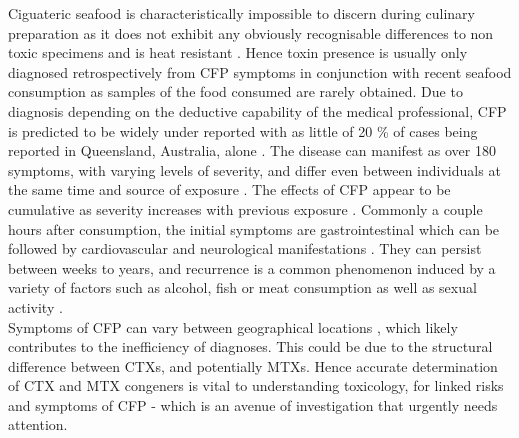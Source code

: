 \documentclass[12pt]{article}
\begin{document}
Ciguateric seafood is characteristically impossible to discern during culinary preparation as it does not exhibit any obviously recognisable differences to non toxic specimens and is heat resistant \cite{withers1982ciguatera}. Hence toxin presence is usually only diagnosed retrospectively from CFP symptoms in conjunction with recent seafood consumption \cite{sims1987theoretical} as samples of the food consumed are rarely obtained. Due to diagnosis depending on the deductive capability of the medical professional, CFP is predicted to be widely under reported with as little of 20 \% of cases being reported  in Queensland, Australia, alone \cite{lewis2006ciguatera}. The disease can manifest as over 180 symptoms, with varying levels of severity, and differ even between individuals at the same time and source of exposure \cite{sims1987theoretical}. The effects of CFP appear to be cumulative as severity increases with previous exposure \cite{emerson1983preliminary}. Commonly a couple hours after consumption, the initial symptoms are gastrointestinal which can be followed by cardiovascular and neurological manifestations \cite{sims1987theoretical}. They can persist between weeks to years, and recurrence is a common phenomenon induced by a variety of factors such as alcohol, fish or meat consumption \cite{lewis2006ciguatera} as well as sexual activity \cite{lange1992travel}. \\
Symptoms of CFP can vary between geographical locations \cite{molgo2000ciguatera,dickey2010ciguatera}, which likely contributes to the inefficiency of diagnoses. This could be due to the structural difference between CTXs, and potentially MTXs. Hence accurate determination of CTX and MTX congeners is vital to understanding toxicology, for linked risks and symptoms of CFP - which is an avenue of investigation that urgently needs attention.\\
\end{document}
